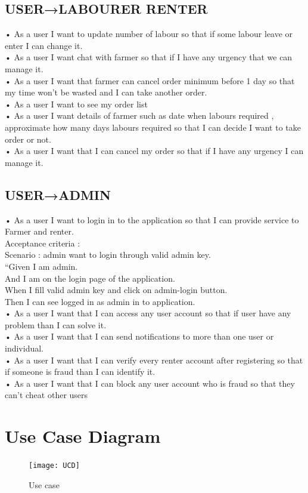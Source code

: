 \documentclass[conference]{IEEEtran}
\begin{document}
\subsection{USER→LABOURER RENTER}
• As a user I want to update number of labour so that if some labour leave or enter I can change it.\\
• As a user I want chat with farmer so that if I have any urgency that we can manage it.\\
• As a user I want that farmer can cancel order minimum before 1 day so that my 
time won’t be wasted and I can take another order.\\
• As a user I want to see my order list\\
• As a user I want details of farmer such as date when labours required ,
approximate how many days labours required so that I can decide I want to take 
order or not.\\
• As a user I want that I can cancel my order so that if I have any urgency I can manage it.\\
\subsection{USER→ADMIN}
• As a user I want to login in to the application so that I can provide service to Farmer and renter.\\
 Acceptance criteria :\\
 Scenario : admin want to login through valid admin key.\\
“Given I am admin.\\
And I am on the login page of the application.\\
When I fill valid admin key and click on admin-login button.\\
Then I can see logged in as admin in to application.\\
• As a user I want that I can access any user account so that if user have any problem than I can solve it.\\
• As a user I want that I can send notifications to more than one user or individual.\\
• As a user I want that I can verify every renter account after registering so that if someone is fraud than I can identify it.\\
• As a user I want that I can block any user account who is fraud so that they can’t cheat other users\\

\section{Use Case Diagram}
\begin{figure}[h!]
\centering
\texttt{[image: UCD]}
\caption{Use case}
\label{fig:UCD}
\end{figure}
\end{document}
